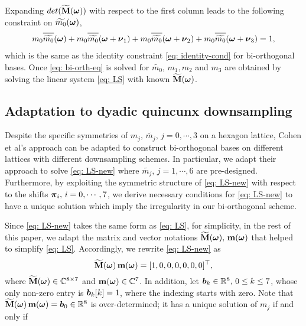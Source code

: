 Expanding $det(\widetilde{\mathbf{M}}(\boldsymbol{\omega}))$ with respect to the first column leads to the following constraint on $\widetilde{m_{0}}(\boldsymbol{\omega})$, 
\begin{align}\label{eq: bi-orth-eq}
m_0\sbarm{0} + m_0\sbarmn{0}{1} + m_0\sbarmn{0}{2} + m_0\sbarmn{0}{3} = 1,
\end{align}
which is the same as the identity constraint \eqref{eq: identity-cond} for bi-orthogonal bases. 
Once \eqref{eq: bi-orth-eq} is solved for $\widetilde{m_0}$, $m_1,m_2$ and $m_3$ are obtained by solving the linear system \eqref{eq: LS} with known $\widetilde{\mathbf{M}}(\boldsymbol{\omega})$.

\subsection{Adaptation to dyadic quincunx downsampling}\label{subsec: adapt-cohen}

Despite the specific symmetries of $m_j,\,\widetilde{m_j},\, j = 0,\cdots,3$ on a hexagon lattice, Cohen et al's approach can be adapted to construct bi-orthogonal bases on different lattices with different downsampling schemes. In particular, we adapt their approach to solve \eqref{eq: LS-new} where $\widetilde{m_j},\, j= 1,\cdots,6$ are pre-designed. Furthermore, by exploiting the symmetric structure of \eqref{eq: LS-new} with respect to the shifts $\boldsymbol{\pi}_i,\,i=0,\cdots,7$, we derive necessary conditions for \eqref{eq: LS-new} to have a unique solution which imply the irregularity in our bi-orthogonal scheme.

Since \eqref{eq: LS-new} takes the same form as \eqref{eq: LS}, for simplicity, in the rest of this paper, we adapt the matrix and vector notations $\widetilde{\mathbf{M}}(\boldsymbol{\omega}),\,\mathbf{m}(\boldsymbol{\omega}) $ that helped to simplify \eqref{eq: LS}. Accordingly, we rewrite \eqref{eq: LS-new} as  \[\widetilde{\mathbf{M}}(\boldsymbol{\omega})\, \mathbf{m} (\boldsymbol{\omega})= [1,0,0,0,0,0,0]^\top,\]  where $\widetilde{\mathbf{M}}(\boldsymbol{\omega})\in\mathbb{C}^{8\times 7}$ and $\mathbf{m}(\boldsymbol{\omega})\in\mathbb{C}^7$. In addition, let $\boldsymbol{b}_k \in\mathbb{R}^8,\, 0\leq k\leq 7$, whose only non-zero entry is $\boldsymbol{b}_k[k] = 1$, where the indexing starts with zero. Note that $\widetilde{\mathbf{M}}(\boldsymbol{\omega})\,\mathbf{m}(\boldsymbol{\omega}) = \boldsymbol{b}_0\in\mathbb{R}^8$ is over-determined; it has a unique solution of $m_j$ if and only if 

